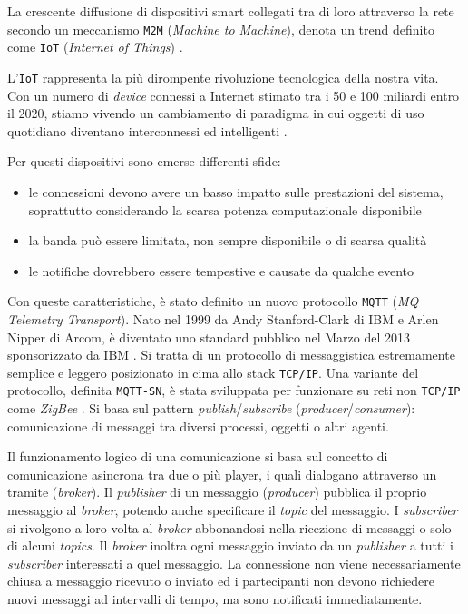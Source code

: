 La crescente diffusione di dispositivi smart collegati tra di loro attraverso la rete secondo un meccanismo \verb+M2M+ (\textit{Machine to Machine}), denota un trend definito come \verb+IoT+ (\textit{Internet of Things}) \cite{Rfc7452}.

L'\verb+IoT+ rappresenta la più dirompente rivoluzione tecnologica della nostra vita.
Con un numero di \textit{device} connessi a Internet stimato tra i 50 e 100 miliardi entro il 2020, stiamo vivendo un cambiamento di paradigma in cui oggetti di uso quotidiano diventano interconnessi ed intelligenti \cite{IoT}.

Per questi dispositivi sono emerse differenti sfide:
\begin{itemize}
\item le connessioni devono avere un basso impatto sulle prestazioni del sistema, soprattutto considerando la scarsa potenza computazionale disponibile
\item la banda può essere limitata, non sempre disponibile o di scarsa qualità
\item le notifiche dovrebbero essere tempestive e causate da qualche evento
\end{itemize}

Con queste caratteristiche, è stato definito un nuovo protocollo \verb+MQTT+ (\textit{MQ Telemetry Transport}).
Nato nel 1999 da Andy Stanford-Clark di IBM e Arlen Nipper di Arcom, è diventato uno standard pubblico nel Marzo del 2013 sponsorizzato da IBM \cite{Mqtt}.
Si tratta di un protocollo di messaggistica estremamente semplice e leggero posizionato in cima allo stack \verb+TCP/IP+.
Una variante del protocollo, definita \verb+MQTT-SN+, è stata sviluppata per funzionare su reti non \verb+TCP/IP+ come \textit{ZigBee} \cite{MqttSn, ZigBee}.
Si basa sul pattern \textit{publish}/\textit{subscribe} (\textit{producer}/\textit{consumer}): comunicazione di messaggi tra diversi processi, oggetti o altri agenti.

Il funzionamento logico di una comunicazione si basa sul concetto di comunicazione asincrona tra due o più player, i quali dialogano attraverso un tramite (\textit{broker}).
Il \textit{publisher} di un messaggio (\textit{producer}) pubblica il proprio messaggio al \textit{broker}, potendo anche specificare il \textit{topic} del messaggio.
I \textit{subscriber} si rivolgono a loro volta al \textit{broker} abbonandosi nella ricezione di messaggi o solo di alcuni \textit{topics}.
Il \textit{broker} inoltra ogni messaggio inviato da un \textit{publisher} a tutti i \textit{subscriber} interessati a quel messaggio.
La connessione non viene necessariamente chiusa a messaggio ricevuto o inviato ed i partecipanti non devono richiedere nuovi messaggi ad intervalli di tempo, ma sono notificati immediatamente.

